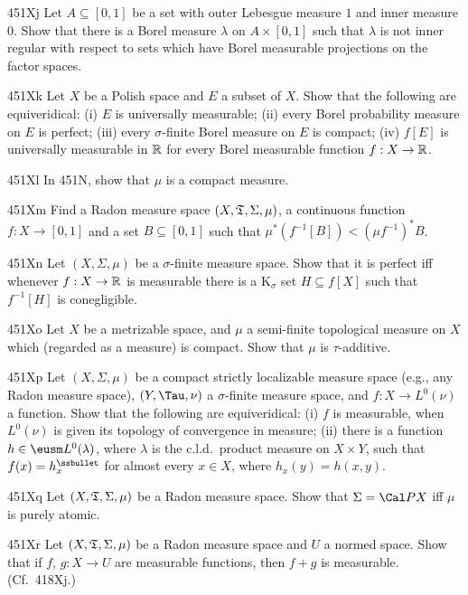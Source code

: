 {\spheader 451Xj Let $A\subseteq[0,1]$ be a set with outer
Lebesgue measure $1$ and inner measure $0$.   Show that there is a
Borel measure $\lambda$ on $A\times[0,1]$ such that
$\lambda$ is not inner regular with respect to sets which have Borel
measurable projections on the factor spaces.

\spheader 451Xk Let $X$ be a Polish space and $E$ a subset of $X$.
Show that the following are equiveridical:  (i) $E$ is universally
measurable;  (ii) every Borel probability measure on $E$ is perfect;
(iii) every $\sigma$-finite Borel measure on $E$ is compact;  (iv)
$f[E]$ is universally measurable in $\Bbb R$ for every Borel measurable
function $f:X\to\Bbb R$.

\spheader 451Xl In 451N, show that $\mu$ is a compact measure.

\spheader 451Xm Find a Radon measure space $(X,\frak T,\Sigma,\mu)$,
a continuous function $f:X\to[0,1]$ and a set
$B\subseteq[0,1]$ such that $\mu^*(f^{-1}[B])<(\mu f^{-1})^*B$.

\spheader 451Xn
Let $(X,\Sigma,\mu)$ be a $\sigma$-finite measure space.   Show that it
is perfect iff whenever $f:X\to\Bbb R$ is measurable there is a
K$_{\sigma}$ set $H\subseteq f[X]$ such that $f^{-1}[H]$ is
conegligible.

\spheader 451Xo Let $X$ be a metrizable space, and $\mu$ a semi-finite
topological measure on $X$ which (regarded as a measure) is compact.
Show that $\mu$ is $\tau$-additive.

\spheader 451Xp Let $(X,\Sigma,\mu)$ be a compact strictly localizable
measure space (e.g., any Radon measure space), $(Y,\Tau,\nu)$ a
$\sigma$-finite measure space, and $f:X\to L^0(\nu)$ a function.   Show
that the following are equiveridical:  (i) $f$ is measurable, when
$L^0(\nu)$ is given its topology of convergence in measure;
(ii) there is a function $h\in\eusm L^0(\lambda)$, where $\lambda$ is
the c.l.d.\ product measure on $X\times Y$, such that
$f(x)=h_x^{\ssbullet}$ for
almost every $x\in X$, where $h_x(y)=h(x,y)$.   

\sqheader 451Xq Let $(X,\frak T,\Sigma,\mu)$ be a Radon measure space.
Show that $\Sigma=\Cal PX$ iff $\mu$ is purely atomic.   

\spheader 451Xr Let $(X,\frak T,\Sigma,\mu)$ be a Radon measure space
and $U$ a normed space.   Show that if $f$, $g:X\to U$ are measurable
functions, then $f+g$ is measurable.   (Cf.\ 418Xj.)

}
